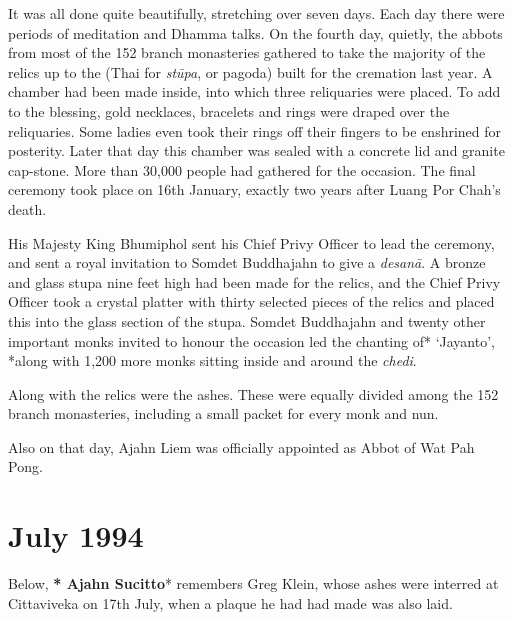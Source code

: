 It was all done quite beautifully, stretching over seven days. Each day
there were periods of meditation and Dhamma talks. On the fourth day, 
quietly, the abbots from most of the 152 branch monasteries gathered to
take the majority of the relics up to the (Thai for \emph{stūpa}, or
pagoda) built for the cremation last year. A chamber had been made
inside, into which three reliquaries were placed. To add to the
blessing, gold necklaces, bracelets and rings were draped over the
reliquaries. Some ladies even took their rings off their fingers to be
enshrined for posterity. Later that day this chamber was sealed with a
concrete lid and granite cap-stone. More than 30,000 people had gathered
for the occasion. The final ceremony took place on 16th January, exactly
two years after Luang Por Chah's death. 

His Majesty King Bhumiphol sent his Chief Privy Officer to lead the
ceremony, and sent a royal invitation to Somdet Buddhajahn to give a
\emph{desanā}. A bronze and glass stupa nine feet high had been made for
the relics, and the Chief Privy Officer took a crystal platter with
thirty selected pieces of the relics and placed this into the glass
section of the stupa. Somdet Buddhajahn and twenty other important monks
invited to honour the occasion led the chanting of* `Jayanto', *along
with 1,200 more monks sitting inside and around the \emph{chedi}. 

Along with the relics were the ashes. These were equally divided among
the 152 branch monasteries, including a small packet for every monk and
nun. 

Also on that day, Ajahn Liem was officially appointed as Abbot of Wat
Pah Pong. 

\chapter{July 1994}

Below, \textbf{* Ajahn Sucitto}* remembers Greg Klein, whose ashes were
interred at Cittaviveka on 17th July, when a plaque he had had made was
also laid. 


